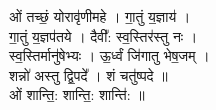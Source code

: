 ओं तच्छं॒ योरावृ॑णीमहे । गा॒तुं य॒ज्ञाय॑ ।\\
गा॒तुं य॒ज्ञप॑तये । दैवी᳚: स्व॒स्तिर॑स्तु नः ।\\
स्व॒स्तिर्मानु॑षेभ्यः । ऊ॒र्ध्वं जि॑गातु भेष॒जम् ।\\
शन्नो॑ अस्तु द्वि॒पदे᳚ । शं चतु॑ष्पदे ॥\\
ओं शान्ति॒: शान्ति॒: शान्ति॑: ॥\\